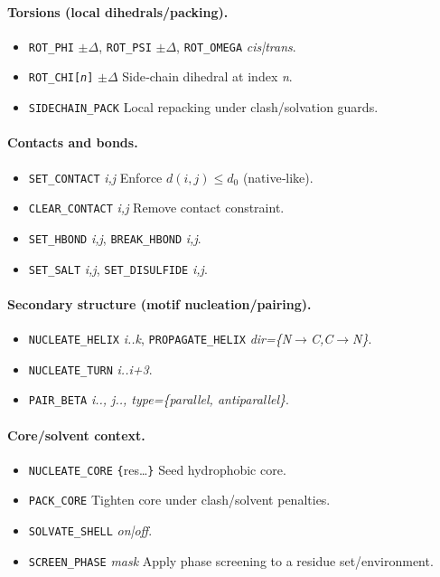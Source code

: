 \documentclass[12pt,a4paper]{article}
\begin{document}
\paragraph{Torsions (local dihedrals/packing).}
\begin{itemize}
  \item \texttt{ROT\_PHI} \textit{$\pm\Delta$}, \texttt{ROT\_PSI} \textit{$\pm\Delta$}, \texttt{ROT\_OMEGA} \textit{cis|trans}.
  \item \texttt{ROT\_CHI[\textit{n}]} \textit{$\pm\Delta$} \quad Side‑chain dihedral at index \textit{n}.
  \item \texttt{SIDECHAIN\_PACK} \quad Local repacking under clash/solvation guards.
\end{itemize}

\paragraph{Contacts and bonds.}
\begin{itemize}
  \item \texttt{SET\_CONTACT} \textit{i,j} \quad Enforce $d(i,j) \le d_0$ (native‑like).
  \item \texttt{CLEAR\_CONTACT} \textit{i,j} \quad Remove contact constraint.
  \item \texttt{SET\_HBOND} \textit{i,j}, \texttt{BREAK\_HBOND} \textit{i,j}.
  \item \texttt{SET\_SALT} \textit{i,j}, \texttt{SET\_DISULFIDE} \textit{i,j}.
\end{itemize}

\paragraph{Secondary structure (motif nucleation/pairing).}
\begin{itemize}
  \item \texttt{NUCLEATE\_HELIX} \textit{i..k}, \texttt{PROPAGATE\_HELIX} \textit{dir=\{N$\to$C,C$\to$N\}}.
  \item \texttt{NUCLEATE\_TURN} \textit{i..i+3}.
  \item \texttt{PAIR\_BETA} \textit{i.., j.., type=\{parallel, antiparallel\}}.
\end{itemize}

\paragraph{Core/solvent context.}
\begin{itemize}
  \item \texttt{NUCLEATE\_CORE} \texttt{\{}res\ldots\texttt{\}} \quad Seed hydrophobic core.
  \item \texttt{PACK\_CORE} \quad Tighten core under clash/solvent penalties.
  \item \texttt{SOLVATE\_SHELL} \textit{on|off}.
  \item \texttt{SCREEN\_PHASE} \textit{mask} \quad Apply phase screening to a residue set/environment.
\end{itemize}
\end{document}
